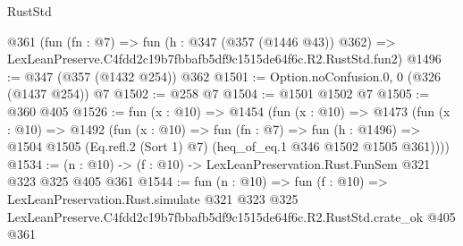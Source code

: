 \begin{lexlean}{RustStd}
\begin{coremodule}
    @361
    (fun (fn : @7) =>
    fun (h : @347 (@357 (@1446 @43)) @362) =>
    LexLeanPreserve.C4fdd2c19b7fbbafb5df9c1515de64f6c.R2.RustStd.fun2)
@1496 := @347 (@357 (@1432 @254)) @362
@1501 := Option.noConfusion.{0, 0} (@326 (@1437 @254)) @7
@1502 := @258 @7
@1504 := @1501 @1502 @7
@1505 := @360 @405
@1526 := fun (x : @10) =>
  @1454
    (fun (x : @10) =>
    @1473
      (fun (x : @10) =>
      @1492
        (fun (x : @10) =>
        fun (fn : @7) =>
        fun (h : @1496) =>
        @1504 @1505 (Eq.refl.{2} (Sort 1) @7) (heq_of_eq.{1} @346 @1502 @1505 @361))))
@1534 := (n : @10) -> (f : @10) -> LexLeanPreservation.Rust.FunSem @321 @323 @325 @405 @361
@1544 := fun (n : @10) =>
  fun (f : @10) =>
  LexLeanPreservation.Rust.simulate
    @321
    @323
    @325
    LexLeanPreserve.C4fdd2c19b7fbbafb5df9c1515de64f6c.R2.RustStd.crate_ok
    @405
    @361
\end{coremodule}
\end{lexlean}
